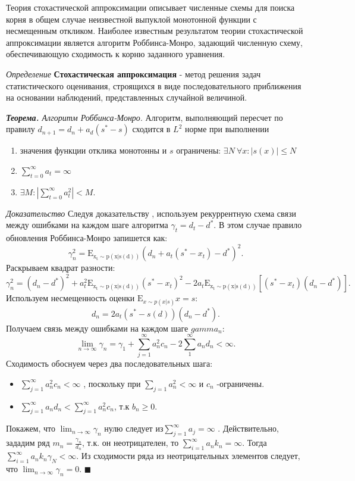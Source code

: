 Теория стохастической аппроксимации описывает численные схемы для поиска корня в общем случае неизвестной выпуклой монотонной
функции с несмещенным откликом. Наиболее известным результатом теории стохастической аппроксимации является алгоритм
Роббинса-Монро, задающий численную схему, обеспечивающую сходимость к корню заданного уравнения.

\textit{Определение} \textbf{Стохастическая аппроксимация} - метод решения задач статистического оценивания,
строящихся в виде последовательного приближения на основании наблюдений, представленных случайной величиной.

\textit{\textbf{Теорема.} Алгоритм Роббинса-Монро}. Алгоритм, выполняющий пересчет по 
правилу $d_{n+1} =d _n + a_d(s^*-s)$ сходится в $L^2$ норме при выполнении \begin{enumerate}
    \item значения функции отклика монотонны и $s$ ограничены: $\exists N\ \forall x : | s(x) | \le N$
    \item $\sum_{t=0}^\infty a_t = \infty$
    \item $\exists M : |\sum_{t=0}^\infty a_t^2 |< M$.
\end{enumerate}
\textit{Доказательство} \label{monro}
Следуя доказательству \cite{blum1954approximation}, используем рекуррентную схема связи между ошибками 
на каждом шаге алгоритма $\gamma_t = d_t - d^*$. 
В этом случае правило обновления Роббинса-Монро запишется как: 
\begin{equation}
    \gamma_n^2 = \mathrm{E_{x_t \sim p(x|s(d))}}(d_n+a_t(s^*-x_t) -d^*)^2.
\end{equation}
Раскрываем квадрат разности:
\begin{equation}
    \gamma_n^2 = (d_n - d^*)^2 + a_t^2 \mathrm{E_{x_t \sim p(x|s(d))}} (s^*-x_t)^2 - 2 a_t \mathrm{E_{x_t \sim p(x|s(d))}}\left[ (s^*-x_t)(d_n-d^*) \right].
\end{equation}
Используем несмещенность оценки $\mathrm{E}_{x \sim p(x|s)} x = s$:
\begin{equation}
    d_n =2 a_t (s^* -s(d))(d_n-d^*).
\end{equation}
Получаем связь между ошибками на каждом шаге $gamma_n$:
\begin{equation}
    \lim_{n \rightarrow \infty} \gamma_n = \gamma_1 + \sum_{j=1}^\infty a_n^2 c_n -2 \sum_1^{\infty} a_n d_n < \infty.
\end{equation}
Сходимость обоснуем через два последовательных шага: \begin{itemize}
    \item  $\sum_{j=1}^\infty a_n^2 c_n < \infty$ , поскольку при $\sum_{j=1} a_n^2 < \infty $ и $c_n$ -ограничены.
    \item $\sum_{j=1}^\infty a_n d_n < \sum_{j=1}^\infty a_n^2 c_n$,  т.к $b_n \ge 0$.
\end{itemize}
Покажем, что $\lim_{n \rightarrow \infty}{\gamma_n}$  нулю следует из$\sum_{j=1}^\infty a_j  =\infty$ .
Действительно, зададим ряд $m_n = \frac{\gamma_n}{d_n}$, т.к. он неотрицателен, то $\sum_{i=1}^{\infty} a_n k_n = \infty $. 
Тогда $\sum_{i=1}^{\infty} a_n k_n \gamma_N < \infty $. 
Из сходимости ряда из неотрицательных элементов следует, что $\lim_{n \rightarrow \infty} \gamma_n =0$.
$\blacksquare$

